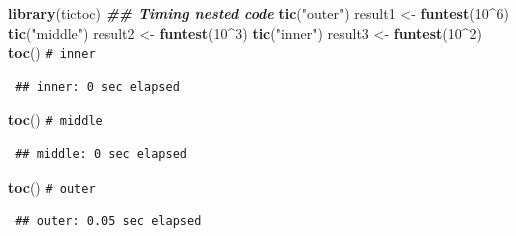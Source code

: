 \documentclass[
  spanish,
  10pt,
]{book}
\newenvironment{Shaded}{\begin{snugshade}}{\end{snugshade}}
\newcommand{\CommentTok}[1]{\textcolor[rgb]{0.56,0.35,0.01}{\textit{#1}}}
\newcommand{\DecValTok}[1]{\textcolor[rgb]{0.00,0.00,0.81}{#1}}
\newcommand{\DocumentationTok}[1]{\textcolor[rgb]{0.56,0.35,0.01}{\textbf{\textit{#1}}}}
\newcommand{\FunctionTok}[1]{\textcolor[rgb]{0.13,0.29,0.53}{\textbf{#1}}}
\newcommand{\NormalTok}[1]{#1}
\newcommand{\OtherTok}[1]{\textcolor[rgb]{0.56,0.35,0.01}{#1}}
\newcommand{\SpecialCharTok}[1]{\textcolor[rgb]{0.81,0.36,0.00}{\textbf{#1}}}
\newcommand{\StringTok}[1]{\textcolor[rgb]{0.31,0.60,0.02}{#1}}
\theoremstyle{break}
\theoremstyle{nonumberplain}
\renewcommand{\CommentTok}[1]{\textcolor[rgb]{0.41,0.41,0.41}{\texttt{#1}}}
\begin{document}
\begin{Shaded}
\begin{Highlighting}[]
\FunctionTok{library}\NormalTok{(tictoc)}
\DocumentationTok{\#\# Timing nested code}
\FunctionTok{tic}\NormalTok{(}\StringTok{"outer"}\NormalTok{)}
\NormalTok{   result1 }\OtherTok{\textless{}{-}} \FunctionTok{funtest}\NormalTok{(}\DecValTok{10}\SpecialCharTok{\^{}}\DecValTok{6}\NormalTok{)}
   \FunctionTok{tic}\NormalTok{(}\StringTok{"middle"}\NormalTok{)}
\NormalTok{      result2 }\OtherTok{\textless{}{-}} \FunctionTok{funtest}\NormalTok{(}\DecValTok{10}\SpecialCharTok{\^{}}\DecValTok{3}\NormalTok{)}
      \FunctionTok{tic}\NormalTok{(}\StringTok{"inner"}\NormalTok{)}
\NormalTok{         result3 }\OtherTok{\textless{}{-}} \FunctionTok{funtest}\NormalTok{(}\DecValTok{10}\SpecialCharTok{\^{}}\DecValTok{2}\NormalTok{)}
      \FunctionTok{toc}\NormalTok{() }\CommentTok{\# inner}
\end{Highlighting}
\end{Shaded}

\begin{verbatim}
 ## inner: 0 sec elapsed
\end{verbatim}

\begin{Shaded}
\begin{Highlighting}[]
   \FunctionTok{toc}\NormalTok{() }\CommentTok{\# middle}
\end{Highlighting}
\end{Shaded}

\begin{verbatim}
 ## middle: 0 sec elapsed
\end{verbatim}

\begin{Shaded}
\begin{Highlighting}[]
\FunctionTok{toc}\NormalTok{() }\CommentTok{\# outer}
\end{Highlighting}
\end{Shaded}

\begin{verbatim}
 ## outer: 0.05 sec elapsed
\end{verbatim}
\end{document}
